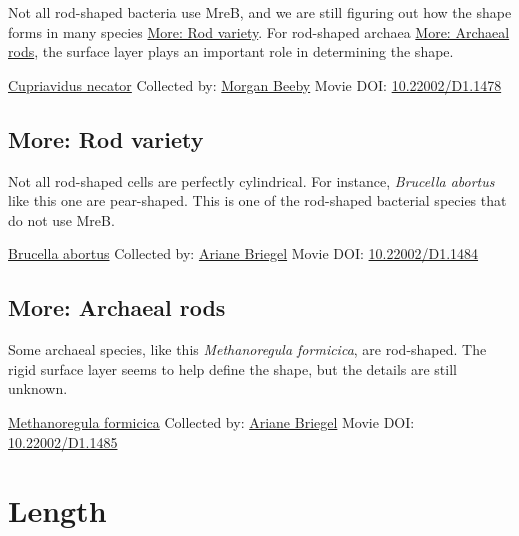 \documentclass[]{tufte-book}
\begin{document}
Not all rod-shaped bacteria use MreB, and we are still figuring out how the shape forms in many species \protect\hyperlink{Rod_variety}{More: Rod variety}. For rod-shaped archaea \protect\hyperlink{Archaeal_rods}{More: Archaeal rods}, the surface layer plays an important role in determining the shape.



\hypertarget{htmlwidget-c1f8b3092b148a8ffd9b}{}

\label{fig:3-2}\protect\hyperlink{tree}{Cupriavidus necator} Collected by: \protect\hyperlink{morgan_beeby}{Morgan Beeby} Movie DOI: \href{https://doi.org/10.22002/D1.1478}{10.22002/D1.1478}

\hypertarget{Rod_variety}{%
\subsection*{More: Rod variety}\label{Rod_variety}}

Not all rod-shaped cells are perfectly cylindrical. For instance, \emph{Brucella abortus} like this one are pear-shaped. This is one of the rod-shaped bacterial species that do not use MreB.



\hypertarget{htmlwidget-a815932adb208238ebdb}{}

\label{fig:3-2a}\protect\hyperlink{tree}{Brucella abortus} Collected by: \protect\hyperlink{ariane_briegel}{Ariane Briegel} Movie DOI: \href{https://doi.org/10.22002/D1.1484}{10.22002/D1.1484}

\hypertarget{Archaeal_rods}{%
\subsection*{More: Archaeal rods}\label{Archaeal_rods}}

Some archaeal species, like this \emph{Methanoregula formicica}, are rod-shaped. The rigid surface layer seems to help define the shape, but the details are still unknown.



\hypertarget{htmlwidget-b788dcee1bc7d154c086}{}

\label{fig:3-2b}\protect\hyperlink{tree}{Methanoregula formicica} Collected by: \protect\hyperlink{ariane_briegel}{Ariane Briegel} Movie DOI: \href{https://doi.org/10.22002/D1.1485}{10.22002/D1.1485}

\hypertarget{length}{%
\section{Length}\label{length}}
\end{document}
